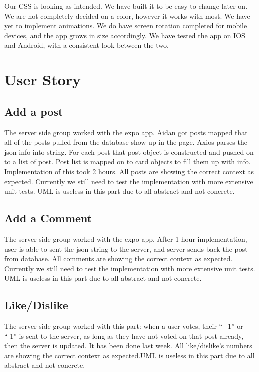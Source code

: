 \documentclass[12pt]{article}
\begin{document}
Our CSS is looking as intended. We have built it to be easy to change later on.
We are not completely decided on a color, however it works with most. We have
yet to implement animations. We do have screen rotation completed for mobile
devices, and the app grows in size accordingly. We have tested the app on IOS
and Android, with a consistent look between the two.

\section{User Story}

\subsection{Add a post}
The server side group worked with the expo app. Aidan got posts mapped that all
of the posts pulled from the database show up in the page. Axios parses the json
info into string. For each post that post object is constructed and pushed on to
a list of post. Post list is mapped on to card objects to fill them up with
info. Implementation of this took 2 hours. All posts are showing the correct
context as expected. Currently we still need to test the implementation with
more extensive unit tests. UML is useless in this part due to all abstract and
not concrete.

\subsection{Add a Comment}
The server side group worked with the expo app. After 1 hour implementation,
user is able to sent the json string to the server, and server sends back the
post from database. All comments are showing the correct context as expected.
Currently we still need to test the implementation with more extensive unit
tests. UML is useless in this part due to all abstract and not concrete.

\subsection{Like/Dislike}
The server side group worked with this part: when a user votes, their “+1” or
“-1” is sent to the server, as long as they have not voted on that post already,
then the server is updated. It has been done last week. All like/dislike’s
numbers are showing the correct context as expected.UML is useless in this part
due to all abstract and not concrete.
\end{document}
